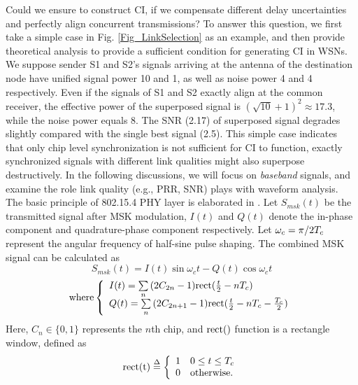 \documentclass[conference]{IEEEtran}
\begin{document}
\indent Could we ensure to construct CI, if we compensate different delay uncertainties and perfectly align concurrent transmissions? To answer this question, we first take a simple case in Fig. \ref{Fig_LinkSelection} as an example, and then provide theoretical analysis to provide a sufficient condition for generating CI in WSNs.\\
\indent We suppose sender S1 and S2's signals arriving at the antenna of the destination node have unified signal power 10 and 1, as well as noise power 4 and 4 respectively.
Even if the signals of S1 and S2 exactly align at the common receiver, the effective power of the superposed signal is ${(\sqrt {10}  + 1)^2 { \approx 17.3}}$, while the noise power equals 8.
The SNR (2.17) of superposed signal degrades slightly compared with the single best signal (2.5).
This simple case indicates that only chip level synchronization is not sufficient for CI to function, exactly synchronized signals with different link qualities might also superpose destructively.
In the following discussions, we will focus on \emph{baseband} signals, and examine the role link quality (e.g., PRR, SNR) plays with waveform analysis.\\
\indent The basic principle of 802.15.4 PHY layer is elaborated in \cite{oh2006building}. Let $S_{msk} (t)$ be the transmitted signal after MSK modulation, $I(t)$ and $Q(t)$ denote the
in-phase component and quadrature-phase component respectively.
Let  $\omega _c  =
{\pi  \mathord{\left/
 {\vphantom {\pi  {2T_c }}} \right.
 \kern-\nulldelimiterspace} {2T_c }}
$ represent the angular frequency of half-sine pulse shaping.
The combined MSK signal can be calculated as
\begin{equation}
\label{Equ_MSKsignal}
S_{msk} (t) = I(t)\sin \omega _c t - Q(t)\cos \omega _c t
\end{equation}
\begin{align}
\label{equ_ItQt}
{\rm{where   }}\left\{ \begin{array}{l}
 I(t) = \sum\limits_n {(2C_{2n}  - 1){\rm{rect}}(\frac{t}{2} - nT_c )}  \\
 Q(t) = \sum\limits_n {(2C_{2n + 1}  - 1){\rm{rect}}(\frac{t}{2} - nT_c  - \frac{{T_c }}{2})}  \\
 \end{array} \right.
\end{align}
Here, $C_n  \in \{ 0,1\}$ represents the $n$th chip, and $\rm{rect}()$ function is a rectangle window, defined as
\begin{equation}
\label{Equ_rect}
\rm{rect}(t) \buildrel \Delta \over = \left\{ \begin{array}{l}
 1{\rm{~~~     0}} \le t \le T_c  \\
 0{\rm{~~~     }}\rm{otherwise}. \\
 \end{array} \right.
\end{equation}
\end{document}
